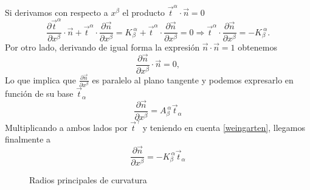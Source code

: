 Si derivamos con respecto a $x^{\beta}$ el producto $\vec{t}^{\alpha}\cdot\vec{n}=0$
\begin{equation}\label{weingarten}
\frac{\partial \vec{t}^{\alpha}}{\partial x^{\beta}}\cdot\vec{n}+
\vec{t}^{\alpha}\cdot\frac{\partial \vec{n}}{\partial x^{\beta}}=
K_{\beta}^{\ \alpha}+\vec{t}^{\alpha}\cdot\frac{\partial \vec{n}}{\partial x^{\beta}}=0
\Rightarrow \vec{t}^{\alpha}\cdot\frac{\partial \vec{n}}{\partial x^{\beta}}=-K_{\beta}^{\ \alpha}.
\end{equation}
Por otro lado, derivando de igual forma la expresión $\vec{n}\cdot\vec{n}=1$ obtenemos 
\begin{equation*}
\frac{\partial \vec{n}}{\partial x^{\beta} }\cdot \vec{n}=0,
\end{equation*}
Lo que implica que $\frac{\partial \vec{n}}{\partial x^{\beta}}$ es paralelo
al plano tangente y podemos expresarlo en función de su base $\vec{t}_{\alpha}$
\begin{equation*}
\frac{\partial \vec{n}}{\partial x^{\beta}}=A_{\beta}^{\ \alpha}\vec{t}_{\alpha}
\end{equation*}
Multiplicando a ambos lados por $\vec{t}^{\gamma}$ y teniendo en cuenta
\eqref{weingarten}, llegamos finalmente a 
\begin{equation}\label{derivada_n}
\frac{\partial \vec{n}}{\partial x^{\beta}}=-K_{\beta}^{\ \alpha}\vec{t}_{\alpha}
\end{equation}

\begin{figure}[h]
\centering
 \resizebox{\columnwidth}{!}{}
\caption{Radios principales de curvatura}\label{radios_curvatura-fig}
\end{figure}


